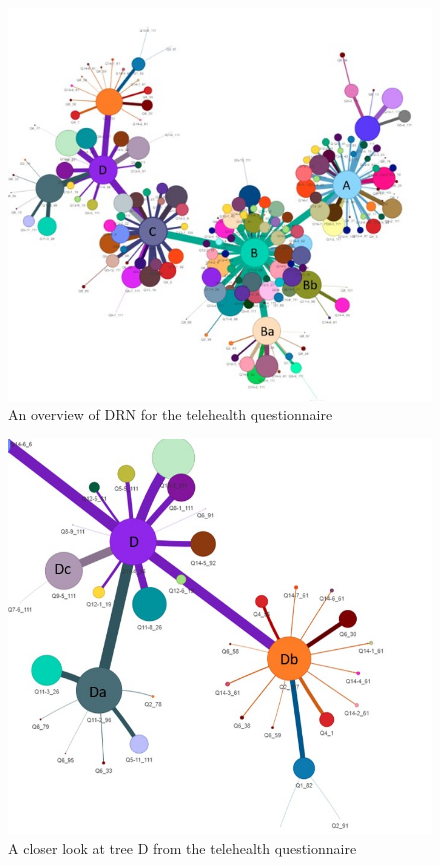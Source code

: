 \begin{figure}[]
    \noindent
    \includegraphics[width=\textwidth]{Overview-v3.jpg}
    \caption{An overview of DRN for the telehealth questionnaire \label{Overview}}
\end{figure}

\begin{figure}[]
    \noindent
    \includegraphics[width=\columnwidth]{Tree-D.jpg}
    \caption{A closer look at tree D from the telehealth questionnaire\label{DTree2}}
\end{figure}

